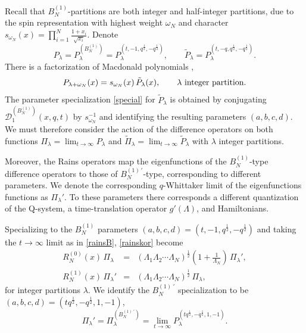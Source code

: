 \documentclass[12pt]{amsart}
\newcommand{\lL}{{\Lambda}}
\newcommand{\half}{\frac{1}{2}}
\numberwithin{equation}{section}
\begin{document}
Recall that  $B_N^{(1)}$-partitions are both integer and half-integer partitions, due to the spin representation with highest weight $\omega_N$ and character  $s_{\omega_N}(x)=\prod_{i=1}^N\frac{1+x_i}{\sqrt{x_i}}$.
Denote
\begin{equation}\label{special}
P_\lambda= P_\lambda^{(B_N^{(1)})}=P_\lambda^{(t,-1,q^\half,-q^\half)}, \qquad
\tilde P_\lambda= P_\lambda^{(t,-q,q^\half,-q^\half)} .
\end{equation}
%
%
%
%
%
%
%
There is a factorization of Macdonald polynomials \cite{vandiej},
\begin{equation}\label{factopol}
P_{\lambda+\omega_N}(x)=s_{\omega_N}(x)\, \tilde P_{\lambda}(x) , \qquad \hbox{$\lambda$ integer partition}.
\end{equation}
%
%
%
%
%
%
%
%
%
%
%
%
%
%
%
The parameter specialization \eqref{special} for $\tilde P_\lambda$ is obtained by conjugating 
${\mathcal D}_1^{(B_N^{(1)})}(x,q,t)$ by $s_{\omega_N}^{-1}$ and identifying the resulting parameters $(a,b,c,d)$.
%
%
%
We  must therefore consider the action of the difference operators on both functions 
$\Pi_\lambda=\lim_{t\to\infty}P_\lambda$ and $\tilde \Pi_\lambda=\lim_{t\to\infty} \tilde P_\lambda$ with $\lambda$ integer partitions.






%

%
%




%
%
%
%
%
%

Moreover, the Rains operators map the eigenfunctions of the $B_{N}^{(1)}$-type difference 
operators to those of
%
$B_N^{(1)\,'}$-type, corresponding to different parameters. We denote the corresponding $q$-Whittaker limit of the eigenfunctions functions as $\Pi_\lambda'$. To these parameters there corresponds a different quantization of the Q-system, a
time-translation operator $g'(\lL)$, and Hamiltonians.
%

%
%

Specializing to the $B_N^{(1)}$ parameters $(a,b,c,d)=(t,-1,q^\half,-q^\half)$ and taking the $t\to\infty$ limit as in \eqref{rainsB}, 
\eqref{rainskor} become
\begin{eqnarray}
R_{N}^{(0)}(x)\, \Pi_\lambda&=&(\lL_1\lL_2\cdots \lL_N)^\half \left(1+\frac{1}{\lL_N}\right) \, \Pi_\lambda',\nonumber \\
R_{N}^{(1)}(x)\, \Pi_\lambda'&=&(\lL_1\lL_2\cdots \lL_N)^\half\, \Pi_\lambda, \label{backnforthB}
\end{eqnarray}
for integer partitions $\lambda$. 
We identify the $B_N^{(1)\ '}$ specialization to be $(a,b,c,d)=(t q^\half,-q^\half,1,-1)$,
%
$$\Pi_\lambda'= \Pi_\lambda^{(B_N^{(1)\ '})}=\lim_{t\to\infty} P_\lambda^{(t q^\half,-q^\half,1,-1)}.
$$
\end{document}

